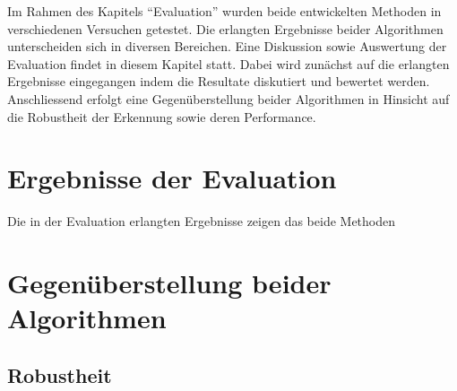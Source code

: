 Im Rahmen des Kapitels \enquote{Evaluation} wurden beide entwickelten Methoden in verschiedenen Versuchen getestet. Die erlangten Ergebnisse beider Algorithmen unterscheiden sich in diversen Bereichen. Eine Diskussion sowie Auswertung der Evaluation findet in diesem Kapitel statt. Dabei wird zunächst auf die erlangten Ergebnisse eingegangen indem die Resultate diskutiert und bewertet werden. Anschliessend erfolgt eine Gegenüberstellung beider Algorithmen in Hinsicht auf die Robustheit der Erkennung sowie deren Performance.

\section{Ergebnisse der Evaluation}
\label{sec:anforderunsevaluierung}

Die in der Evaluation erlangten Ergebnisse zeigen das beide Methoden 







% 

\section{Gegenüberstellung beider Algorithmen}
\label{sec:gegenueberstellung}

\subsection{Robustheit}
\label{subsec:discussion_robsutness}


